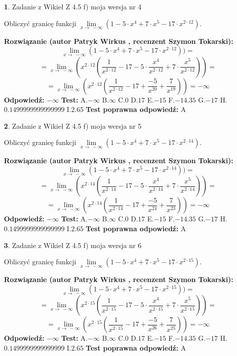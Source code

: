 \documentclass[12pt, a4paper]{article}
\theoremstyle{definition} %
\newtheorem{zad}{}
\newcommand{\zadStart}[1]{\begin{zad}#1\newline}
\newcommand{\zadStop}{\end{zad}}
\newcommand{\rozwStart}[2]{\noindent \textbf{Rozwiązanie (autor #1 , recenzent #2): }\newline}
\newcommand{\rozwStop}{\newline}
\newcommand{\odpStart}{\noindent \textbf{Odpowiedź:}\newline}
\newcommand{\odpStop}{\newline}
\newcommand{\testStart}{\noindent \textbf{Test:}\newline}
\newcommand{\testStop}{\newline}
\newcommand{\kluczStart}{\noindent \textbf{Test poprawna odpowiedź:}\newline}
\newcommand{\kluczStop}{\newline}
\begin{document}
\zadStart{Zadanie z Wikieł Z 4.5 f) moja wersja nr 4}


Obliczyć granicę funkcji  $\lim\limits_{x\to\ -\infty}(1 - 5 \cdot x^{4}+7 \cdot x^{5}- 17 \cdot x^{2\cdot12})$.
\zadStop
\rozwStart{Patryk Wirkus}{Szymon Tokarski}
$$\lim\limits_{x\to\ -\infty}(1 - 5 \cdot x^{4}+7 \cdot x^{5}- 17 \cdot x^{2\cdot12}))=$$
$$=\lim\limits_{x\to\ -\infty}(x^{2\cdot12}(\frac{1}{x^{2\cdot12}}-17 -5 \cdot \frac{x^{4}}{x^{2\cdot12}}+7 \cdot \frac{x^{5}}{x^{2\cdot12}}))=$$
$$=\lim\limits_{x\to\ -\infty}(x^{2\cdot12}(\frac{1}{x^{2\cdot12}}-17 + \frac{-5}{x^{20}}+ \frac{7}{x^{19}}))=-\infty$$
\rozwStop
\odpStart
$-\infty$
\odpStop
\testStart
A.$-\infty$ B.$\infty$ C.$0$ D.$17$ E.$-15$
F.$-14.35$ G.$-17$
H.$0.1499999999999999$
I.$2.65$
\testStop
\kluczStart
A
\kluczStop



\zadStart{Zadanie z Wikieł Z 4.5 f) moja wersja nr 5}


Obliczyć granicę funkcji  $\lim\limits_{x\to\ -\infty}(1 - 5 \cdot x^{4}+7 \cdot x^{5}- 17 \cdot x^{2\cdot14})$.
\zadStop
\rozwStart{Patryk Wirkus}{Szymon Tokarski}
$$\lim\limits_{x\to\ -\infty}(1 - 5 \cdot x^{4}+7 \cdot x^{5}- 17 \cdot x^{2\cdot14}))=$$
$$=\lim\limits_{x\to\ -\infty}(x^{2\cdot14}(\frac{1}{x^{2\cdot14}}-17 -5 \cdot \frac{x^{4}}{x^{2\cdot14}}+7 \cdot \frac{x^{5}}{x^{2\cdot14}}))=$$
$$=\lim\limits_{x\to\ -\infty}(x^{2\cdot14}(\frac{1}{x^{2\cdot14}}-17 + \frac{-5}{x^{24}}+ \frac{7}{x^{23}}))=-\infty$$
\rozwStop
\odpStart
$-\infty$
\odpStop
\testStart
A.$-\infty$ B.$\infty$ C.$0$ D.$17$ E.$-15$
F.$-14.35$ G.$-17$
H.$0.1499999999999999$
I.$2.65$
\testStop
\kluczStart
A
\kluczStop



\zadStart{Zadanie z Wikieł Z 4.5 f) moja wersja nr 6}


Obliczyć granicę funkcji  $\lim\limits_{x\to\ -\infty}(1 - 5 \cdot x^{4}+7 \cdot x^{5}- 17 \cdot x^{2\cdot15})$.
\zadStop
\rozwStart{Patryk Wirkus}{Szymon Tokarski}
$$\lim\limits_{x\to\ -\infty}(1 - 5 \cdot x^{4}+7 \cdot x^{5}- 17 \cdot x^{2\cdot15}))=$$
$$=\lim\limits_{x\to\ -\infty}(x^{2\cdot15}(\frac{1}{x^{2\cdot15}}-17 -5 \cdot \frac{x^{4}}{x^{2\cdot15}}+7 \cdot \frac{x^{5}}{x^{2\cdot15}}))=$$
$$=\lim\limits_{x\to\ -\infty}(x^{2\cdot15}(\frac{1}{x^{2\cdot15}}-17 + \frac{-5}{x^{26}}+ \frac{7}{x^{25}}))=-\infty$$
\rozwStop
\odpStart
$-\infty$
\odpStop
\testStart
A.$-\infty$ B.$\infty$ C.$0$ D.$17$ E.$-15$
F.$-14.35$ G.$-17$
H.$0.1499999999999999$
I.$2.65$
\testStop
\kluczStart
A
\kluczStop
\end{document}
